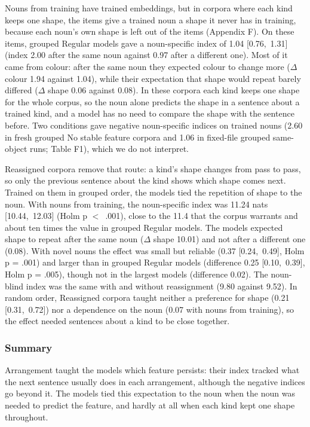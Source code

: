Nouns from training have trained embeddings, but in corpora where each kind keeps one shape, the items give a trained noun a shape it never has in training, because each noun's own shape is left out of the items (Appendix F). On these items, grouped Regular models gave a noun-specific index of 1.04 [0.76,~1.31] (index 2.00 after the same noun against 0.97 after a different one). Most of it came from colour: after the same noun they expected colour to change more ($\Delta$ colour \textminus{}1.94 against \textminus{}1.04), while their expectation that shape would repeat barely differed ($\Delta$ shape 0.06 against \textminus{}0.08). In these corpora each kind keeps one shape for the whole corpus, so the noun alone predicts the shape in a sentence about a trained kind, and a model has no need to compare the shape with the sentence before. Two conditions gave negative noun-specific indices on trained nouns (\textminus{}2.60 in fresh grouped No stable feature corpora and \textminus{}1.06 in fixed-file grouped same-object runs; Table F1), which we do not interpret.

Reassigned corpora remove that route: a kind's shape changes from pass to pass, so only the previous sentence about the kind shows which shape comes next. Trained on them in grouped order, the models tied the repetition of shape to the noun. With nouns from training, the noun-specific index was 11.24 nats [10.44,~12.03] (Holm p $<$~.001), close to the 11.4 that the corpus warrants and about ten times the value in grouped Regular models. The models expected shape to repeat after the same noun ($\Delta$ shape 10.01) and not after a different one (0.08). With novel nouns the effect was small but reliable (0.37 [0.24,~0.49], Holm p = .001) and larger than in grouped Regular models (difference 0.25 [0.10,~0.39], Holm p = .005), though not in the largest models (difference 0.02). The noun-blind index was the same with and without reassignment (9.80 against 9.52). In random order, Reassigned corpora taught neither a preference for shape (0.21 [\textminus{}0.31,~0.72]) nor a dependence on the noun (\textminus{}0.07 with nouns from training), so the effect needed sentences about a kind to be close together.

\subsubsection*{Summary}
Arrangement taught the models which feature persists: their index tracked what the next sentence usually does in each arrangement, although the negative indices go beyond it. The models tied this expectation to the noun when the noun was needed to predict the feature, and hardly at all when each kind kept one shape throughout.

